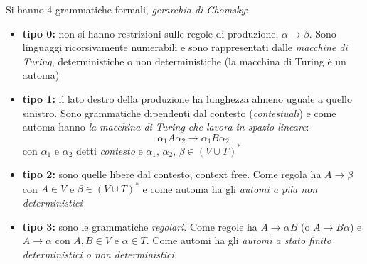 Si hanno 4 grammatiche formali, \textit{gerarchia di Chomsky}:
\begin{itemize}
	\item \textbf{tipo 0:} non si hanno restrizioni sulle regole di produzione, $\alpha\to\beta$. Sono linguaggi ricorsivamente numerabili e sono rappresentati dalle \textit{macchine di Turing}, deterministiche o non deterministiche (la macchina di Turing è un automa)
	\item \textbf{tipo 1:}  il lato destro della produzione ha lunghezza almeno uguale a quello sinistro. Sono grammatiche dipendenti dal contesto (\textit{contestuali}) e come automa hanno\textit{ la macchina di Turing che lavora in spazio lineare}:
				$$\alpha_1A\alpha_2\to \alpha_1B\alpha_2$$
				con $\alpha_1$ e $\alpha_2$ detti \textit{contesto} e $\alpha_1,\,\alpha_2,\, \beta\in (V\cup T)^*$
	\item \textbf{tipo 2:} sono quelle libere dal contesto, context free. Come regola ha $A\to\beta$ con $A\in V$ e $\beta\in (V\cup T)^*$ e come automa ha gli \textit{automi a pila non deterministici}
	\item \textbf{tipo 3:} sono le grammatiche \textit{regolari}. Come regole ha $A\to\alpha B$ (o $A\to B\alpha$) e $A\to\alpha$  con $A,B\in V$ e $\alpha\in T$. Come automi ha gli \textit{automi a stato finito deterministici o non deterministici}
\end{itemize}
\newpage
